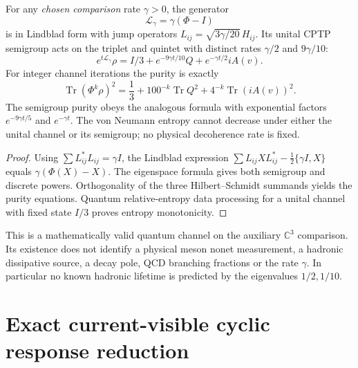 \documentclass[12pt,a4paper]{article}
\begin{document}
\begin{corollary}
\label{p4b:cor:cc17-nonet-gkls-purity}
For any \emph{chosen comparison} rate $\gamma>0$, the generator
\[\boxed{\mathcal L_\gamma=\gamma(\Phi-I)}\]
is in Lindblad form with jump operators
$L_{ij}=\sqrt{3\gamma/20}\,H_{ij}$. Its unital CPTP semigroup
acts on the triplet and quintet with distinct rates
$\gamma/2$ and $9\gamma/10$:
\[
 e^{t\mathcal L_\gamma}\rho
 =I/3+e^{-9\gamma t/10}Q+e^{-\gamma t/2}iA(v).
\]
For integer channel iterations the purity is exactly
\[\boxed{\operatorname{Tr}(\Phi^k\rho)^2
=\frac13+100^{-k}\operatorname{Tr}Q^2
       +4^{-k}\operatorname{Tr}(iA(v))^2.}\]
The semigroup purity obeys the analogous formula with exponential
factors $e^{-9\gamma t/5}$ and $e^{-\gamma t}$.
The von Neumann entropy cannot decrease under either the unital
channel or its semigroup; no physical decoherence rate is fixed.
\end{corollary}
\begin{proof}
Using $\sum L_{ij}^*L_{ij}=\gamma I$, the Lindblad expression
$\sum L_{ij}X L_{ij}^*-\frac12\{\gamma I,X\}$ equals
$\gamma(\Phi(X)-X)$. The eigenspace formula gives both semigroup
and discrete powers. Orthogonality of the three Hilbert--Schmidt
summands yields the purity equations. Quantum relative-entropy
data processing for a unital channel with fixed state $I/3$
proves entropy monotonicity.
\end{proof}

\begin{remark}
This is a mathematically valid quantum channel on the auxiliary
$\mathbb C^3$ comparison. Its existence does not identify a physical
meson nonet measurement, a hadronic dissipative source, a decay pole,
QCD branching fractions or the rate $\gamma$. In particular
no known hadronic lifetime is predicted by the eigenvalues $1/2,1/10$.
\end{remark}

\printbibliography

\section{Exact current-visible cyclic response reduction}
\label{p4b:sec:v356-current-krylov}
\end{document}
